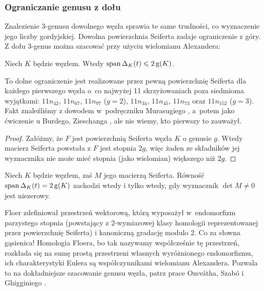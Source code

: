 
\subsubsection{Ograniczanie genusu z dołu}
Znalezienie 3-genusu dowolnego węzła sprawia te same trudności, co wyznaczenie jego liczby gordyjskiej.
Dowolna powierzchnia Seiferta zadaje ograniczenie z góry.
Z dołu 3-genus można szacować przy użyciu wielomianu Alexandera:
%

\begin{proposition}
\label{prp:alexander_genus}%
    Niech $K$ będzie węzłem.
    Wtedy $\operatorname{span} \Delta_K(t) \leqslant 2\operatorname{g}(K)$.
\end{proposition}

To dolne ograniczenie jest realizowane przez pewną powierzchnię Seiferta dla każdego pierwszego węzła o~co najwyżej 11 skrzyżowaniach poza siedmioma wyjątkami: $11n_{42}$, $11n_{67}$, $11n_{97}$ ($g = 2$), $11n_{34}$, $11n_{45}$, $11n_{73}$ oraz $11n_{152}$ ($g = 3$).
Fakt znaleźliśmy z dowodem w~podręczniku Murasugiego \cite[s. 121]{murasugi1996}, a~potem jako ćwiczenie u Burdego, Zieschanga \cite[s. 137]{burde2014}, ale nie wiemy, kto pierwszy to zauważył.

\begin{proof}
    Załóżmy, że $F$ jest powierzchnią Seiferta węzła $K$ o genusie $g$.
    Wtedy macierz Seiferta powstała z $F$ jest stopnia $2g$, więc żaden ze składników jej wyznacznika nie może mieć stopnia (jako wielomian) większego niż $2g$.
\end{proof}

\begin{proposition}
    Niech $K$ będzie węzłem, zaś $M$ jego macierzą Seiferta.
    Równość $\operatorname{span} \Delta_K(t) = 2\operatorname{g}(K)$ zachodzi wtedy i tylko wtedy, gdy wyznacznik $\det M \neq 0$ jest niezerowy.
\end{proposition}

Floer \cite{floer1990} zdefiniował przestrzeń wektorową, którą wyposażył w~endomorfizm parzystego stopnia (powstający z 2-wymiarowej klasy homologii reprezentowanej przez powierzchnię Seiferta) i kanoniczną gradację modulo 2.
Co za słowna gąsienica!
%
Homologia Floera, bo tak nazywamy współcześnie tę przestrzeń, rozkłada się na sumę prostą przestrzeni własnych wyróżnionego endomorfizmu, ich charakterystyki Eulera są współczynnikami wielomianu Alexandera.
Pozwala to na dokładniejsze szacowanie genusu węzła, patrz prace Ozsvátha, Szabó \cite{szabo2003} i Ghigginiego \cite{ghiggini2008}.
%
%
%

